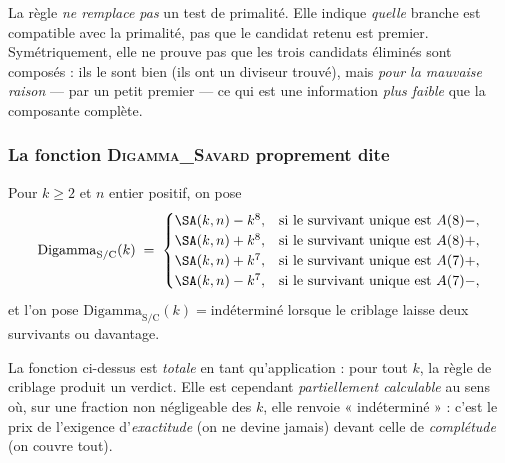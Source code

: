 \begin{boitealerte}
La règle \emph{ne remplace pas} un test de primalité. Elle indique
\emph{quelle} branche est compatible avec la primalité, pas que le
candidat retenu est premier. Symétriquement, elle ne prouve pas que les
trois candidats éliminés sont composés : ils le sont bien (ils ont un
diviseur trouvé), mais \emph{pour la mauvaise raison} --- par un petit
premier --- ce qui est une information \emph{plus faible} que la
composante complète.
\end{boitealerte}

\subsubsection{La fonction \textsc{Digamma\_Savard} proprement dite}

\begin{boiteformule}
Pour $k \ge 2$ et $n$ entier positif, on pose
\[
  \mathrm{Digamma}_{\mathrm{S/C}}(k) \;=\;
  \begin{cases}
    \SA(k,n) - k^{8}, & \text{si le survivant unique est } A(8)-,\\
    \SA(k,n) + k^{8}, & \text{si le survivant unique est } A(8)+,\\
    \SA(k,n) + k^{7}, & \text{si le survivant unique est } A(7)+,\\
    \SA(k,n) - k^{7}, & \text{si le survivant unique est } A(7)-,
  \end{cases}
\]
et l'on pose $\mathrm{Digamma}_{\mathrm{S/C}}(k) = \text{indéterminé}$
lorsque le criblage laisse deux survivants ou davantage.
\end{boiteformule}

\begin{boitenote}
La fonction ci-dessus est \emph{totale} en tant qu'application : pour
tout $k$, la règle de criblage produit un verdict. Elle est cependant
\emph{partiellement calculable} au sens où, sur une fraction non
négligeable des $k$, elle renvoie « indéterminé » : c'est le prix de
l'exigence d'\emph{exactitude} (on ne devine jamais) devant celle de
\emph{complétude} (on couvre tout).
\end{boitenote}
